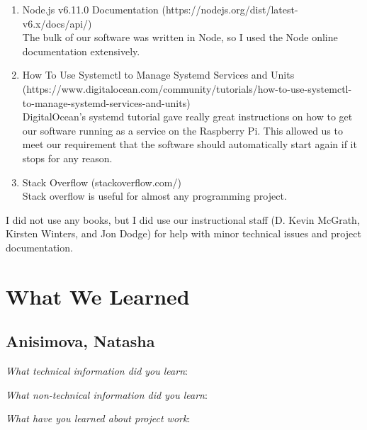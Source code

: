 \documentclass[10pt,draftclsnofoot,onecolumn]{IEEEtran}
\newcommand{\subsubsubsection}[1]{
	\hfill\break\textit{#1}:
}
\begin{document}
\begin{enumerate}
\item Node.js v6.11.0 Documentation (https://nodejs.org/dist/latest-v6.x/docs/api/)\\
The bulk of our software was written in Node, so I used the Node online documentation extensively.
\item How To Use Systemctl to Manage Systemd Services and Units (https://www.digitalocean.com/community/tutorials/how-to-use-systemctl-to-manage-systemd-services-and-units)\\
DigitalOcean's systemd tutorial gave really great instructions on how to get our software running as a service on the Raspberry Pi. This allowed us to meet our requirement that the software should automatically start again if it stops for any reason.
\item Stack Overflow (stackoverflow.com/)\\
Stack overflow is useful for almost any programming project.
\end{enumerate}
I did not use any books, but I did use our instructional staff (D. Kevin McGrath, Kirsten Winters, and Jon Dodge) for help with minor technical issues and project documentation.




















\newpage
\section{What We Learned}

\subsection{Anisimova, Natasha}

\subsubsubsection{What technical information did you learn}

\subsubsubsection{What non-technical information did you learn}

\subsubsubsection{What have you learned about project work}
\end{document}
